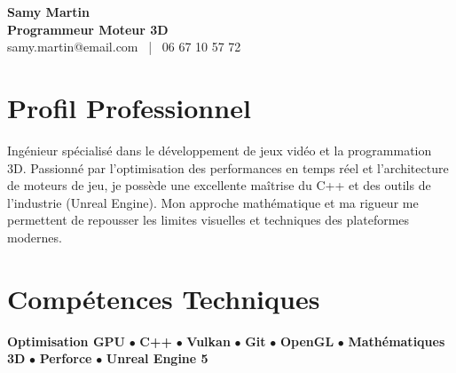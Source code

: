 \documentclass[11pt,a4paper]{article}
\begin{document}
\begin{center}
    {\Huge \textbf{Samy Martin}} \\[0.2cm]
    {\Large \textbf{Programmeur Moteur 3D}} \\[0.1cm]
    samy.martin@email.com \ | \ 06 67 10 57 72
\end{center}

\vspace{0.3cm}

\section*{Profil Professionnel}
\noindent
Ingénieur spécialisé dans le développement de jeux vidéo et la programmation 3D. Passionné par l'optimisation des performances en temps réel et l'architecture de moteurs de jeu, je possède une excellente maîtrise du C++ et des outils de l'industrie (Unreal Engine). Mon approche mathématique et ma rigueur me permettent de repousser les limites visuelles et techniques des plateformes modernes.

\vspace{0.3cm}

\section*{Compétences Techniques}
\noindent
\textbf{Optimisation GPU} $\bullet$ \textbf{C++} $\bullet$ \textbf{Vulkan} $\bullet$ \textbf{Git} $\bullet$ \textbf{OpenGL} $\bullet$ \textbf{Mathématiques 3D} $\bullet$ \textbf{Perforce} $\bullet$ \textbf{Unreal Engine 5}

\vspace{0.3cm}

\end{document}
